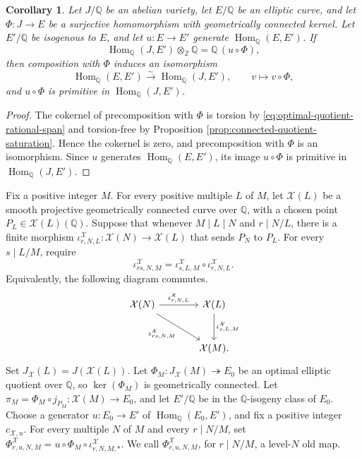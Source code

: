 \documentclass[12pt, letterpaper]{amsart}
\newtheorem{corollary}[theorem]{Corollary}
\theoremstyle{definition}
\theoremstyle{remark}
\newcommand{\Q}{\mathbb Q}
\newcommand{\Z}{\mathbb Z}
\newcommand{\Hom}{\operatorname{Hom}}
\numberwithin{equation}{section}
\begin{document}
\begin{corollary}
\label{cor:optimal-quotient-primitivity}
Let \(J/\Q\) be an abelian variety, let \(E/\Q\) be an elliptic curve, and let
\(\Phi:J\to E\) be a surjective homomorphism with geometrically connected
kernel. Let \(E'/\Q\) be isogenous to \(E\), and let \(u:E\to E'\) generate
\(\Hom_\Q(E,E')\). If
\begin{equation}\label{eq:optimal-quotient-rational-span}
        \Hom_\Q(J,E')\otimes_\Z\Q=\Q\,(u\circ\Phi),
\end{equation}
then composition with \(\Phi\) induces an isomorphism
\[
        \Hom_\Q(E,E')\xrightarrow{\sim}\Hom_\Q(J,E'),
        \qquad v\longmapsto v\circ\Phi,
\]
and \(u\circ\Phi\) is primitive in \(\Hom_\Q(J,E')\).
\end{corollary}

\begin{proof}
The cokernel of precomposition with \(\Phi\) is torsion by
\eqref{eq:optimal-quotient-rational-span} and torsion-free by Proposition
\ref{prop:connected-quotient-saturation}. Hence the cokernel is zero, and
precomposition with \(\Phi\) is an isomorphism. Since \(u\) generates
\(\Hom_\Q(E,E')\), its image
\(u\circ\Phi\) is primitive in \(\Hom_\Q(J,E')\).
\end{proof}

Fix a positive integer \(M\). For every positive multiple \(L\) of \(M\), let
\(\mathcal X(L)\) be a smooth projective geometrically connected curve over
\(\Q\), with a chosen point \(P_L\in\mathcal X(L)(\Q)\). Suppose that whenever
\(M\mid L\mid N\) and \(r\mid N/L\), there is a finite morphism
\(\iota^{\mathcal X}_{r,N,L}:\mathcal X(N)\to\mathcal X(L)\) that sends
\(P_N\) to \(P_L\). For every \(s\mid L/M\), require
\begin{equation}\label{eq:tower-map-compatibility}
        \iota^{\mathcal X}_{rs,N,M}
        =
        \iota^{\mathcal X}_{s,L,M}\circ
        \iota^{\mathcal X}_{r,N,L}.
\end{equation}
Equivalently, the following diagram commutes.
\[
\begin{tikzcd}[column sep=large,row sep=large]
\mathcal X(N)
  \arrow[r,"\iota^{\mathcal X}_{r,N,L}"]
  \arrow[dr,"\iota^{\mathcal X}_{rs,N,M}"']
& \mathcal X(L)
  \arrow[d,"\iota^{\mathcal X}_{s,L,M}"] \\
& \mathcal X(M).
\end{tikzcd}
\]
Set \(J_{\mathcal X}(L)=J(\mathcal X(L))\). Let
\(\Phi_M:J_{\mathcal X}(M)\twoheadrightarrow E_0\) be an optimal elliptic
quotient over \(\Q\), so \(\ker(\Phi_M)\) is geometrically connected. Let
\(\pi_M=\Phi_M\circ j_{P_M}:\mathcal X(M)\to E_0\), and let \(E'/\Q\) be in
the \(\Q\)-isogeny class of \(E_0\). Choose a generator
\(u:E_0\to E'\) of \(\Hom_\Q(E_0,E')\), and fix a positive integer
\(c_{\mathcal X,u}\). For every multiple \(N\) of \(M\) and every
\(r\mid N/M\), set
\(\Phi^{\mathcal X}_{r,u,N,M}
=u\circ\Phi_M\circ\iota^{\mathcal X}_{r,N,M,*}\).
We call \(\Phi^{\mathcal X}_{r,u,N,M}\), for \(r\mid N/M\), a level-\(N\)
old map.
\end{document}
